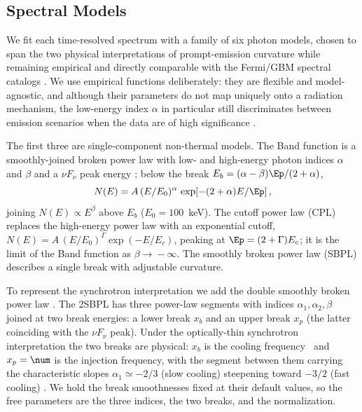 
\subsection{Spectral Models} \label{sec:models}
We fit each time-resolved spectrum with a family of six photon models, chosen to
span the two physical interpretations of prompt-emission curvature while
remaining empirical and directly comparable with the Fermi/GBM spectral catalogs
\citep[e.g.,][]{Kaneko2006,Gruber2014,Yu2016}. We use empirical functions
deliberately: they are flexible and model-agnostic, and although their parameters
do not map uniquely onto a radiation mechanism, the low-energy index $\alpha$ in
particular still discriminates between emission scenarios when the data are of
high significance \citep[e.g.,][]{Acuner2020}.

The first three are single-component non-thermal models. The Band function
\citep{Band1993} is a smoothly-joined broken power law with low- and high-energy
photon indices $\alpha$ and $\beta$ and a $\nu F_\nu$ peak energy \Ep; below the
break $E_b=(\alpha-\beta)\Ep/(2+\alpha)$,
\begin{equation}
N(E)=A\,(E/E_0)^{\alpha}\,\exp\!\left[-(2+\alpha)E/\Ep\right],
\end{equation}
joining $N(E)\propto E^{\beta}$ above $E_b$ ($E_0=100$~keV). The cutoff power law
(CPL) replaces the high-energy power law with an exponential cutoff,
$N(E)=A\,(E/E_0)^{\Gamma}\exp(-E/E_c)$, peaking at $\Ep=(2+\Gamma)E_c$; it is the
limit of the Band function as $\beta\!\to\!-\infty$. The smoothly broken power law
(SBPL) describes a single break with adjustable curvature.

To represent the synchrotron interpretation we add the double smoothly broken
power law \citep[2SBPL;][]{Ravasio2018,Ravasio2019}. The 2SBPL has three
power-law segments with indices $\alpha_1,\alpha_2,\beta$ joined at two break
energies: a lower break $x_b$ and an upper break $x_p$ (the latter coinciding with
the $\nu F_\nu$ peak). Under the optically-thin synchrotron interpretation the two
breaks are physical: $x_b$ is the cooling frequency \nuc\ and $x_p=\num$ is the
injection frequency, with the segment between them carrying the characteristic
slopes $\alpha_1\simeq-2/3$ (slow cooling) steepening toward $-3/2$ (fast cooling)
\citep[e.g.,][]{Sari1998,Oganesyan2017,Ravasio2019}. We hold the break
smoothnesses fixed at their default values, so the free parameters are the three
indices, the two breaks, and the normalization.

